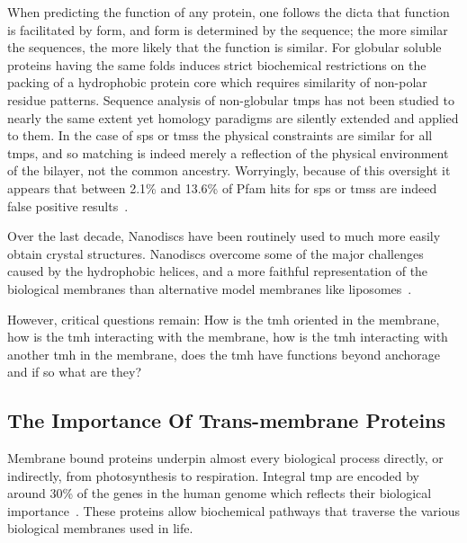 When predicting the function of any protein, one follows the dicta that function is facilitated by form, and form is determined by the sequence; the more similar the sequences, the more likely that the function is similar. For globular soluble proteins having the same folds induces strict biochemical restrictions on the packing of a hydrophobic protein core which requires similarity of non-polar residue patterns. Sequence analysis of non-globular \gls{tmp}s has not been studied to nearly the same extent yet homology paradigms are silently extended and applied to them. In the case of \gls{sp}s or \gls{tms}s the physical constraints are similar for all \gls{tmp}s, and so matching is indeed merely a reflection of the physical environment of the bilayer, not the common ancestry. Worryingly, because of this oversight it appears that between 2.1\% and 13.6\% of Pfam hits for \gls{sp}s or \gls{tms}s are indeed false positive results~\cite{Wong2010}.



 Over the last decade, Nanodiscs have been routinely used to much more easily obtain crystal structures. Nanodiscs overcome some of the major challenges caused by the hydrophobic helices, and a more faithful representation of the biological membranes than alternative model membranes like liposomes~\cite{Borch2009}.

 However, critical questions remain: How is the \gls{tmh} oriented in the membrane, how is the \gls{tmh} interacting with the membrane, how is the \gls{tmh} interacting with another \gls{tmh} in the membrane, does the \gls{tmh} have functions beyond anchorage and if so what are they?




\subsection{The Importance Of Trans-membrane Proteins}
Membrane bound proteins underpin almost every biological process directly, or indirectly, from photosynthesis to respiration. Integral \gls{tmp} are encoded by around 30\% of the genes in the human genome which reflects their biological importance~\cite{Almen2009}. These proteins allow biochemical pathways that traverse the various biological membranes used in life. %

